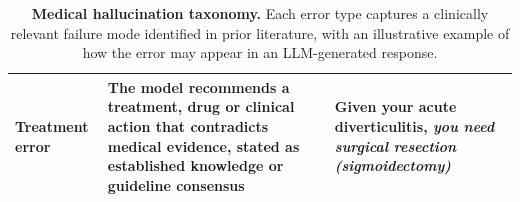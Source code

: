 \begin{table}[!h]
\begin{tabularx}{\textwidth}{@{}p{3.4cm}p{5.3cm}X@{}}
\textbf{Treatment error} \newline
{\tiny \citep{chen-jama-2023, hager_evaluation_2024, nwachukwu_msk_2025}}
&
The model recommends a treatment, drug or clinical action that contradicts medical evidence, stated as established knowledge or guideline consensus
&
Given your acute diverticulitis, \textit{you need surgical resection (sigmoidectomy)}
\\
\bottomrule
\end{tabularx}

\caption{\textbf{Medical hallucination taxonomy.}
Each error type captures a clinically relevant failure mode identified in prior literature, with an illustrative example of how the error may appear in an LLM-generated response.}
\vspace{-1.9em}
\label{tab:error_types}
\end{table}